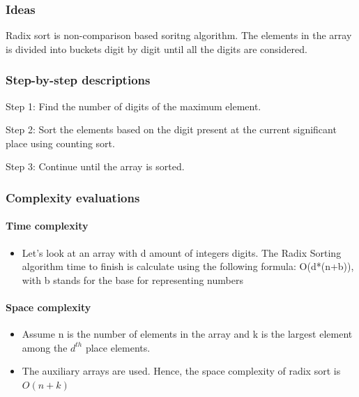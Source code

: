 \documentclass{article}
\newcommand\tab[1][0.5cm]{\hspace*{#1}}
\begin{document}
\subsubsection{Ideas}

\tab Radix sort is non-comparison based soritng algorithm. The elements in the array is divided into buckets digit by digit until all the digits are considered.

\subsubsection{Step-by-step descriptions}

\tab Step 1: Find the number of digits of the maximum element.
\smallskip

Step 2: Sort the elements based on the digit present at the current significant place using counting sort.
\smallskip

Step 3: Continue until the array is sorted.

\subsubsection{Complexity evaluations}

\paragraph{\tab Time complexity}

\begin{itemize}
    \item Let's look at an array with d amount of integers digits. The Radix Sorting algorithm time to finish is calculate using the following formula: O(d*(n+b)), with b stands for the base for representing numbers
    
\end{itemize}

\paragraph{\tab Space complexity}

\begin{itemize}
    \item Assume n is the number of elements in the array and k is the largest element among the $d^{th}$ place elements.
    
    \item The auxiliary arrays are used. Hence, the space complexity of radix sort is $O(n+k)$
\end{itemize}
\end{document}
